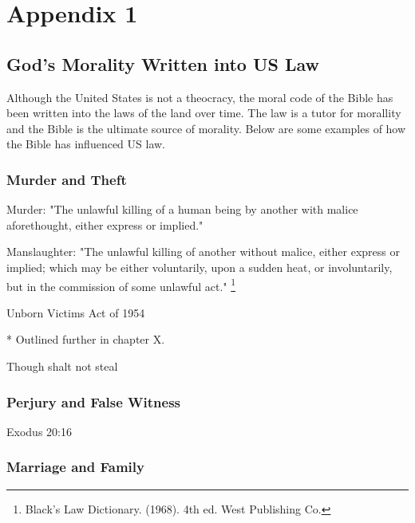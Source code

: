 \chapter{Appendix 1}
\section{God's Morality Written into US Law}

Although the United States is not a theocracy, the moral code of the Bible has been written into the laws of the land over time. The law is a tutor for morallity and the Bible is the ultimate source of morality.
Below are some examples of how the Bible has influenced US law.

\subsection{Murder and Theft}
Murder: "The unlawful killing of a human being by another with malice aforethought, either
express or implied."
\vspace{1\baselineskip}

\noindent Manslaughter: "The unlawful killing of another without malice, either express or implied; which may be either voluntarily, upon a sudden heat, or involuntarily, but in the commission of some unlawful act." \footnote{Black’s Law Dictionary. (1968). 4th ed. West Publishing Co.}

\vspace{2\baselineskip}


Unborn Victims Act of 1954


* Outlined further in chapter X. 



Though shalt not steal

\subsection{Perjury and False Witness}
Exodus 20:16



\subsection{Marriage and Family}

